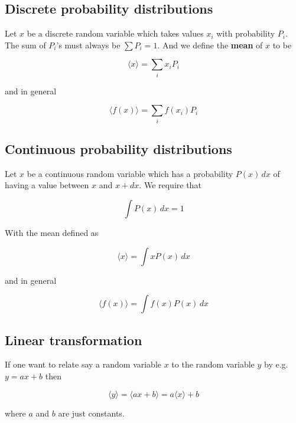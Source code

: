 \documentclass[a4paper]{article}
\begin{document}
\subsection{Discrete probability distributions}

Let $x$ be a discrete random variable which takes values $x_i$ with probability $P_i$. The sum of $P_i$'s must always be $\sum P_i=1$. And we define the \textbf{mean} of $x$ to be

\begin{equation}
	\langle x \rangle = \sum_i x_iP_i
\end{equation}

and in general

\begin{equation}
\langle f(x) \rangle = \sum_i f(x_i)P_i
\end{equation}

\subsection{Continuous probability distributions}

Let $x$ be a continuous random variable which has a probability $P(x)\,dx$ of having a value between $x$ and $x+dx$. We require that

\begin{equation}
	\int P(x)\,dx=1
\end{equation}

With the mean defined as

\begin{equation}
\langle x \rangle = \int xP(x)\,dx
\end{equation}

and in general

\begin{equation}
\langle f(x) \rangle = \int f(x)P(x)\,dx
\end{equation}

\subsection{Linear transformation}

If one want to relate say a random variable $x$ to the random variable $y$ by e.g. $y=ax+b$ then

\begin{equation}
\langle y \rangle = \langle ax+b \rangle= a\langle x \rangle+b
\end{equation}

where $a$ and $b$ are just constants.
\end{document}
